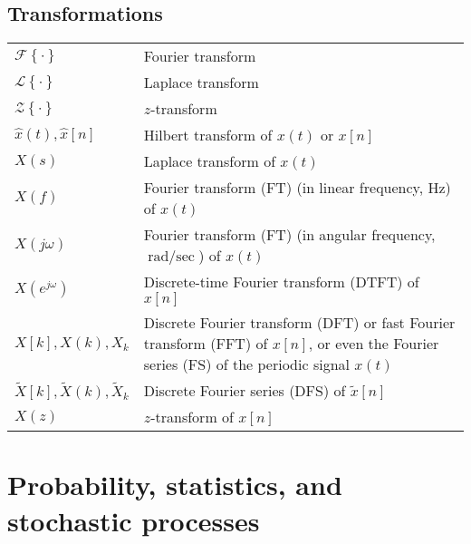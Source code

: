 \documentclass{article}
\begin{document}
\subsection{Transformations}
\begin{xltabular}{\textwidth}{XX}
    \(\mathcal{F}\left\{ \cdot \right\}\) & Fourier transform\\
    \(\mathcal{L}\left\{ \cdot \right\}\) & Laplace transform\\
    \(\mathcal{Z}\left\{ \cdot \right\}\) & \(z\)-transform\\
    \(\hat{x}(t), \hat{x}[n]\) & Hilbert transform of \(x(t)\) or \(x[n]\)\\
    \(X(s)\) & Laplace transform of \(x(t)\)\\
    \(X(f)\) & Fourier transform (FT) (in linear frequency, \(\unit{\Hz}\)) of \(x(t)\)\\
    \(X(j\omega)\) & Fourier transform (FT) (in angular frequency, \(\unit{\radian\per\sec}\)) of \(x(t)\)\\
    \(X(e^{j\omega})\) & Discrete-time Fourier transform (DTFT) of \(x[n]\)\\
    \(X[k], X(k), X_k\) & Discrete Fourier transform (DFT) or fast Fourier transform (FFT) of \(x[n]\), or even the Fourier series (FS) of the periodic signal \(x(t)\)\\
    \(\tilde{X}[k], \tilde{X}(k), \tilde{X}_k\) & Discrete Fourier series (DFS) of \(\tilde{x}[n]\)\\
    \(X(z)\) & \(z\)-transform of \(x[n]\)\\
\end{xltabular}

\section{Probability, statistics, and stochastic processes}
\end{document}
